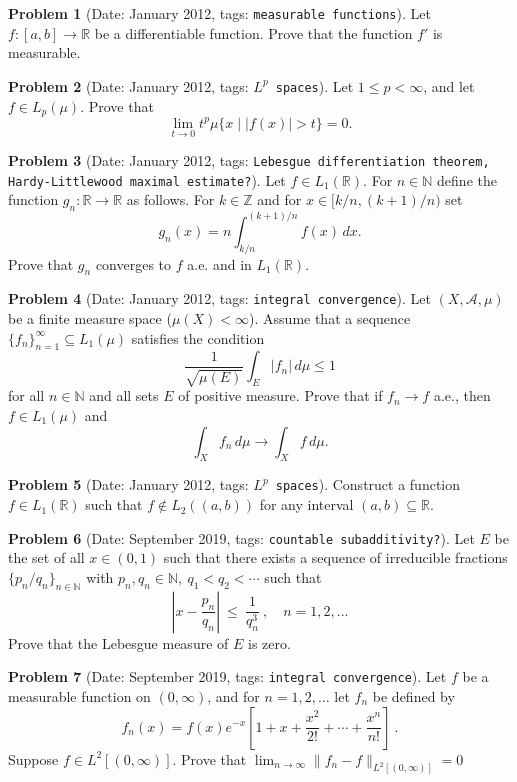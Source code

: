 \documentclass[11pt, notitlepage]{article}
\theoremstyle{definition}
\theoremstyle{definition}
\theoremstyle{definition}
\newtheorem{probstate}{Problem}
\theoremstyle{remark}
\newenvironment{problem}[2]{
    \begin{probstate}[Date: #1, tags: \texttt{#2}]
}
{
  \end{probstate}
}
\newcommand{\R}{\mathbb{R}}
\newcommand{\Z}{\mathbb{Z}}
\newcommand{\N}{\mathbb{N}}
\begin{document}
\begin{problem}{January 2012}{measurable functions}
  Let $f : [a,b] \to \R$ be a differentiable function.  Prove that the function $f'$ is measurable.
\end{problem}

\begin{problem}{January 2012}{$L^p$ spaces}
  Let $1 \le p < \infty$, and let $f \in L_p(\mu)$. Prove that
\[
 \lim_{t \to 0} t^p \mu \{x \mid |f(x)|>t \} =0.
\]
\end{problem}

\begin{problem}{January 2012}{Lebesgue differentiation theorem, Hardy-Littlewood maximal estimate?}
  Let  $f \in L_1(\R)$.
  For $n \in \N$ define the function $g_n: \R \to \R$ as follows.  For $k \in \Z$ and for $x \in [k/n,(k+1)/n)$ set
\[
 g_n(x)=n \int_{k/n}^{(k+1)/n} f (x) \, dx.
\]
Prove that $g_n$ converges to $f$ a.e. and in $L_1(\R)$.
\end{problem}

\begin{problem}{January 2012}{integral convergence}
  Let $(X, \mathcal{A}, \mu)$ be a finite measure space ($\mu(X)< \infty$). Assume that a sequence $\{f_n\}_{n=1}^{\infty} \subseteq L_1(\mu)$ satisfies the condition
\[
  \frac{1}{\sqrt{\mu(E)}} \int_E |f_n| \, d\mu \le 1
\]
for all $n \in \N$ and all sets $E$ of positive measure. Prove that if $f_n \to f$ a.e., then $f \in L_1(\mu)$ and
\[
  \int_X f_n \, d \mu \to \int_X f \, d \mu.
 \]
\end{problem}

\begin{problem}{January 2012}{$L^p$ spaces}
  Construct a function $f \in L_1(\R)$ such that $f \notin L_2((a,b))$ for any interval $(a,b) \subseteq \R$.
\end{problem}

\begin{problem}{September 2019}{countable subadditivity?}
  Let $E$ be the set of all $x\in(0,1)$ such that there exists  a sequence of irreducible fractions
$\{p_n/q_n\}_{n\in\mathbb{N}}$ with $p_n,q_n\in\mathbb{N}, \ q_1<q_2<\cdots$ such that
$$
\left|x-\frac{p_n}{q_n}\right| \ \le \ \frac{1}{q_n^3} \ , \quad n=1,2,...
$$
Prove that the Lebesgue measure of $E$ is zero.
\end{problem}

\begin{problem}{September 2019}{integral convergence}
  Let  $f$ be a measurable function on $(0,\infty)$, and for $n=1,2,\ldots$ let
$f_n$ be defined by
$$
f_n(x)=f(x)e^{-x}\left[1+x+\frac{x^2}{2!}+\cdots+\frac{x^n}{n!}\right] \ .
$$
Suppose $f \in L^2[(0,\infty)]$. Prove that $\lim_{n\to \infty}\|f_n-f\|_{L^2[(0,\infty)]}=0$
\end{problem}
\end{document}
